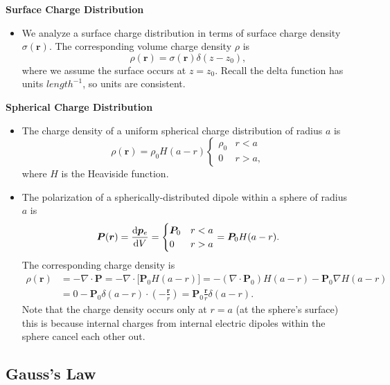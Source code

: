 \documentclass[11pt, a4paper]{article}
\renewcommand{\vec}[1]{\bm{#1}} %
\renewcommand{\r}{\vec{r}}
\newcommand{\pe}{\vec{p}_{e}}  %
\renewcommand{\div}{\nabla \cdot}
\renewcommand{\grad}{\nabla}
\begin{document}
\textbf{Surface Charge Distribution}
\begin{itemize}
	\item We analyze a surface charge distribution in terms of surface charge density $ \sigma(\r) $. The corresponding volume charge density $ \rho $ is
	\begin{equation*}
		\rho(\r) = \sigma(\r) \delta(z - z_{0}),
	\end{equation*}
	where we assume the surface occurs at $ z = z_{0} $. Recall the delta function has units $ \si{length}^{-1} $, so units are consistent.
\end{itemize}

\textbf{Spherical Charge Distribution}
\begin{itemize}	
	\item The charge density of a uniform spherical charge distribution of radius $ a $ is
	\begin{equation*}
		\rho(\r) = \rho_{0}H(a - r)
		\begin{cases}
			\rho_{0} & r < a\\
			0 & r > a,
		\end{cases}
	\end{equation*}
	where $ H $ is the Heaviside function.
	
	\item The polarization of a spherically-distributed dipole within a sphere of radius $ a $ is 
	\begin{equation*}
		\vec{P}(\r) = \dv{\pe}{V} = 
		\begin{cases}
			\vec{P}_{0} & r < a\\
			0 & r > a
		\end{cases}
		= \vec{P}_{0}H(a - r).
	\end{equation*}
	The corresponding charge density is
	\begin{align*}
		\rho(\r) &= - \div \vec{P} = - \div \big[\vec{P}_{0}H(a - r)\big] = - (\div \vec{P}_{0})H(a - r) - \vec{P}_{0} \grad H(a -r)\\
		&= 0 - \vec{P}_{0} \delta(a-r) \cdot \left (-\frac{\r}{r}\right) = \vec{P}_{0}\frac{\r}{r} \delta(a-r).
	\end{align*}
	Note that the charge density occurs only at $ r = a $ (at the sphere's surface) this is because internal charges from internal electric dipoles within the sphere cancel each other out.
\end{itemize}

\subsection{Gauss's Law}
\end{document}

